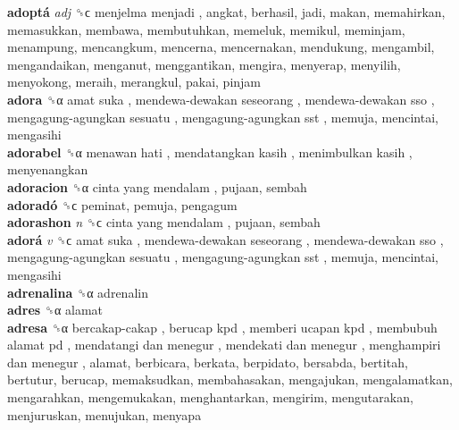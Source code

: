 \textbf{adoptá} \emph{adj}  ␝ϲ   menjelma menjadi , angkat, berhasil, jadi, makan, memahirkan, memasukkan, membawa, membutuhkan, memeluk, memikul, meminjam, menampung, mencangkum, mencerna, mencernakan, mendukung, mengambil, mengandaikan, menganut, menggantikan, mengira, menyerap, menyilih, menyokong, meraih, merangkul, pakai, pinjam  \\
\textbf{adora} ␝α   amat suka ,  mendewa-dewakan seseorang ,  mendewa-dewakan sso ,  mengagung-agungkan sesuatu ,  mengagung-agungkan sst , memuja, mencintai, mengasihi  \\
\textbf{adorabel} ␝α   menawan hati ,  mendatangkan kasih ,  menimbulkan kasih , menyenangkan  \\
\textbf{adoracion} ␝α   cinta yang mendalam , pujaan, sembah  \\
\textbf{adoradó} ␝ϲ  peminat, pemuja, pengagum  \\
\textbf{adorashon} \emph{n}  ␝ϲ   cinta yang mendalam , pujaan, sembah  \\
\textbf{adorá} \emph{v}  ␝ϲ   amat suka ,  mendewa-dewakan seseorang ,  mendewa-dewakan sso ,  mengagung-agungkan sesuatu ,  mengagung-agungkan sst , memuja, mencintai, mengasihi  \\
\textbf{adrenalina} ␝α  adrenalin  \\
\textbf{adres} ␝α  alamat  \\
\textbf{adresa} ␝α   bercakap-cakap ,  berucap kpd ,  memberi ucapan kpd ,  membubuh alamat pd ,  mendatangi dan menegur ,  mendekati dan menegur ,  menghampiri dan menegur , alamat, berbicara, berkata, berpidato, bersabda, bertitah, bertutur, berucap, memaksudkan, membahasakan, mengajukan, mengalamatkan, mengarahkan, mengemukakan, menghantarkan, mengirim, mengutarakan, menjuruskan, menujukan, menyapa  \\
